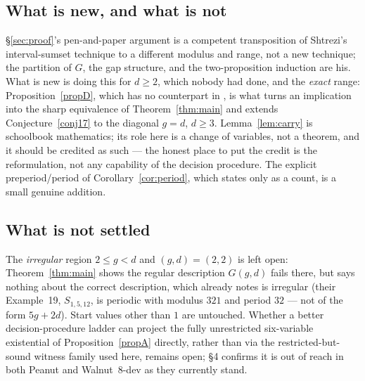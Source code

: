 \documentclass[10pt,reqno]{amsart}
\theoremstyle{plain}
\theoremstyle{definition}
\theoremstyle{remark}
\numberwithin{theorem}{section}
\newcommand{\G}{G}
\begin{document}
\subsection*{What is new, and what is not}
\S\ref{sec:proof}'s pen-and-paper argument is a competent transposition of Shtrezi's
interval-sumset technique \cite{Shtrezi} to a different modulus and range, not a new
technique; the partition of $\G$, the gap structure, and the two-proposition induction are
his. What is new is doing this for $d\ge2$, which nobody had done, and the \emph{exact} range:
Proposition~\ref{propD}, which has no counterpart in \cite{Shtrezi}, is what turns an
implication into the sharp equivalence of Theorem~\ref{thm:main} and extends
Conjecture~\ref{conj17} to the diagonal $g=d$, $d\ge3$. Lemma~\ref{lem:carry} is schoolbook
mathematics; its role here is a change of variables, not a theorem, and it should be credited
as such --- the honest place to put the credit is the reformulation, not any capability of the
decision procedure. The explicit preperiod/period of Corollary~\ref{cor:period}, which
\cite{Fokkink} states only as a count, is a small genuine addition.

\subsection*{What is not settled}
The \emph{irregular} region $2\le g<d$ and $(g,d)=(2,2)$ is left open: Theorem~\ref{thm:main}
shows the regular description $\G(g,d)$ fails there, but says nothing about the correct
description, which \cite[Remarks~18]{Fokkink} already notes is irregular (their Example~19,
$S_{1,5,12}$, is periodic with modulus $321$ and period $32$ --- not of the form $5g+2d$).
Start values other than $1$ are untouched. Whether a better decision-procedure ladder can
project the fully unrestricted six-variable existential of Proposition~\ref{propA} directly,
rather than via the restricted-but-sound witness family used here, remains open; \S4
confirms it is out of reach in both Peanut and Walnut~8-dev as they currently stand.
\end{document}
